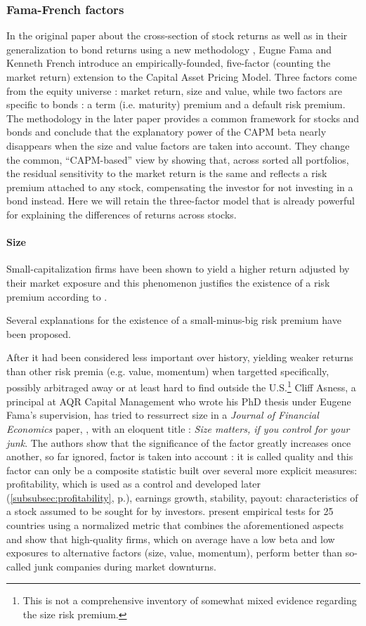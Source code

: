 \subsubsection{Fama-French factors}
In the original paper about the cross-section of stock returns \parencite{Fama1992} as well as in their generalization to bond returns using a new methodology \parencite{Fama1993}, Eugne Fama and Kenneth French introduce an empirically-founded, five-factor (counting the market return) extension to the Capital Asset Pricing Model. Three factors come from the equity universe : market return, size and value, while two factors are specific to bonds : a term (i.e. maturity) premium and a default risk premium. The methodology in the later paper provides a common framework for stocks and bonds and conclude that the explanatory power of the CAPM beta nearly disappears when the size and value factors are taken into account. They change the common, ``CAPM-based'' view by showing that, across sorted all portfolios, the residual sensitivity to the market return is the same and reflects a risk premium attached to any stock, compensating the investor for not investing in a bond instead. Here we will retain the three-factor model that is already powerful for explaining the differences of returns across stocks.
\paragraph{Size}
Small-capitalization firms have been shown to yield a higher return adjusted by their market exposure and this phenomenon justifies the existence of a risk premium according to \cite{Fama1992}.

Several explanations for the existence of a small-minus-big risk premium have been proposed.

After it had been considered less important over history, yielding weaker returns than other risk premia (e.g. value, momentum) when targetted specifically, possibly arbitraged away or at least hard to find outside the U.S.\footnote{This is not a comprehensive inventory of somewhat mixed evidence regarding the size risk premium.} Cliff Asness, a principal at AQR Capital Management who wrote his PhD thesis under Eugene Fama's supervision, has tried to ressurrect size in a \emph{Journal of Financial Economics} paper, \cite{Asness2018}, with an eloquent title : \emph{Size matters, if you control for your junk}. The authors show that the significance of the factor greatly increases once another, so far ignored, factor is taken into account : it is called quality and this factor can only be a composite statistic built over several more explicit measures: profitability, which is used as a control and developed later (\autoref{subsubsec:profitability}, p.\pageref{subsubsec:profitability}), earnings growth, stability, payout: characteristics of a stock assumed to be sought for by investors. \cite{Asness2019} present empirical tests for 25 countries using a normalized metric that combines the aforementioned aspects and show that high-quality firms, which on average have a low beta and low exposures to alternative factors (size, value, momentum), perform better than so-called junk companies during market downturns.
